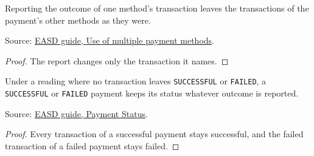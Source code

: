 \begin{theorem}
  \label{thm:payment-record-other}
  Reporting the outcome of one method's transaction leaves the transactions
  of the payment's other methods as they were.

  Source: \href{https://standards.atlassian.net/wiki/spaces/EASD/pages/2592899087/Use+of+multiple+payment+methods+to+pay+for+a+single+item}{EASD guide, Use of multiple payment methods}.
\end{theorem}
\begin{proof}
  The report changes only the transaction it names.
\end{proof}

\begin{theorem}
  \label{thm:payment-final-reading}
  Under a reading where no transaction leaves \texttt{SUCCESSFUL} or
  \texttt{FAILED}, a \texttt{SUCCESSFUL} or \texttt{FAILED} payment keeps its
  status whatever outcome is reported.

  Source: \href{https://standards.atlassian.net/wiki/spaces/EASD/pages/574423154/Payment+Status}{EASD guide, Payment Status}.
\end{theorem}
\begin{proof}
  Every transaction of a successful payment stays successful, and the failed
  transaction of a failed payment stays failed.
\end{proof}


